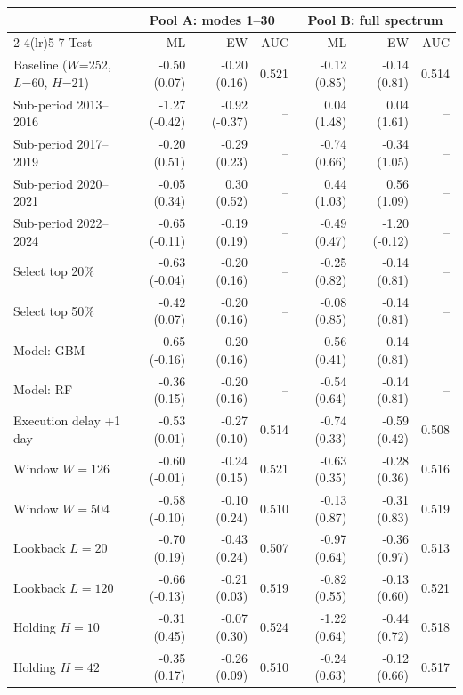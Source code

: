 \begin{tabular}{lrrrrrr}
\toprule
 & \multicolumn{3}{c}{Pool A: modes 1--30} & \multicolumn{3}{c}{Pool B: full spectrum} \\
\cmidrule(lr){2-4}\cmidrule(lr){5-7}
Test & ML & EW & AUC & ML & EW & AUC \\
\midrule
Baseline ($W$=252, $L$=60, $H$=21) & -0.50 (0.07) & -0.20 (0.16) & 0.521 & -0.12 (0.85) & -0.14 (0.81) & 0.514 \\
\midrule
Sub-period 2013--2016 & -1.27 (-0.42) & -0.92 (-0.37) & -- & 0.04 (1.48) & 0.04 (1.61) & -- \\
Sub-period 2017--2019 & -0.20 (0.51) & -0.29 (0.23) & -- & -0.74 (0.66) & -0.34 (1.05) & -- \\
Sub-period 2020--2021 & -0.05 (0.34) & 0.30 (0.52) & -- & 0.44 (1.03) & 0.56 (1.09) & -- \\
Sub-period 2022--2024 & -0.65 (-0.11) & -0.19 (0.19) & -- & -0.49 (0.47) & -1.20 (-0.12) & -- \\
Select top 20\% & -0.63 (-0.04) & -0.20 (0.16) & -- & -0.25 (0.82) & -0.14 (0.81) & -- \\
Select top 50\% & -0.42 (0.07) & -0.20 (0.16) & -- & -0.08 (0.85) & -0.14 (0.81) & -- \\
Model: GBM & -0.65 (-0.16) & -0.20 (0.16) & -- & -0.56 (0.41) & -0.14 (0.81) & -- \\
Model: RF & -0.36 (0.15) & -0.20 (0.16) & -- & -0.54 (0.64) & -0.14 (0.81) & -- \\
Execution delay +1 day & -0.53 (0.01) & -0.27 (0.10) & 0.514 & -0.74 (0.33) & -0.59 (0.42) & 0.508 \\
Window $W=126$ & -0.60 (-0.01) & -0.24 (0.15) & 0.521 & -0.63 (0.35) & -0.28 (0.36) & 0.516 \\
Window $W=504$ & -0.58 (-0.10) & -0.10 (0.24) & 0.510 & -0.13 (0.87) & -0.31 (0.83) & 0.519 \\
Lookback $L=20$ & -0.70 (0.19) & -0.43 (0.24) & 0.507 & -0.97 (0.64) & -0.36 (0.97) & 0.513 \\
Lookback $L=120$ & -0.66 (-0.13) & -0.21 (0.03) & 0.519 & -0.82 (0.55) & -0.13 (0.60) & 0.521 \\
Holding $H=10$ & -0.31 (0.45) & -0.07 (0.30) & 0.524 & -1.22 (0.64) & -0.44 (0.72) & 0.518 \\
Holding $H=42$ & -0.35 (0.17) & -0.26 (0.09) & 0.510 & -0.24 (0.63) & -0.12 (0.66) & 0.517 \\
\bottomrule
\end{tabular}